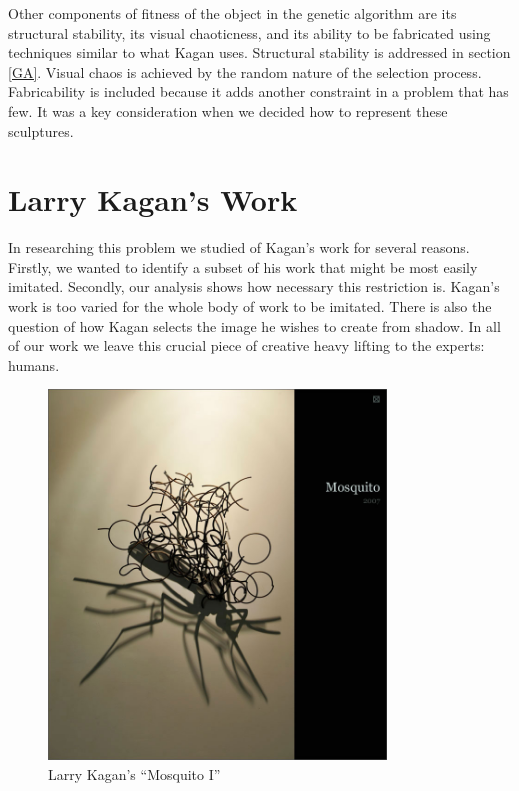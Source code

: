 \documentclass[10pt]{article}
\begin{document}
Other components of fitness of the object in the genetic algorithm
are its structural stability, its visual chaoticness, and its ability
to be fabricated using techniques similar to what Kagan uses. Structural stability
is addressed in section \ref{GA}. Visual
chaos is achieved by the random nature of the selection process.
Fabricability is included because it adds another constraint in a
problem that has few. It was a key consideration when we decided
how to represent these sculptures.

\section{Larry Kagan's Work} \label{kagan}
In researching this problem we studied of Kagan's work for
several reasons. Firstly, we wanted to identify a subset of his work
that might be most easily imitated. Secondly, our analysis shows how
necessary this restriction is. Kagan's work is too varied for the
whole body of work to be imitated. There is also the question of how
Kagan selects the image he wishes to create from shadow. In all of our
work we leave this crucial piece of creative heavy lifting to the
experts: humans.

\begin{figure}[ht]
    \centering
    \includegraphics[width=0.8\textwidth]{mosquito_full.jpg}
    \caption{Larry Kagan's ``Mosquito I''}
    \label{fig:mosquito}
\end{figure}
\end{document}
